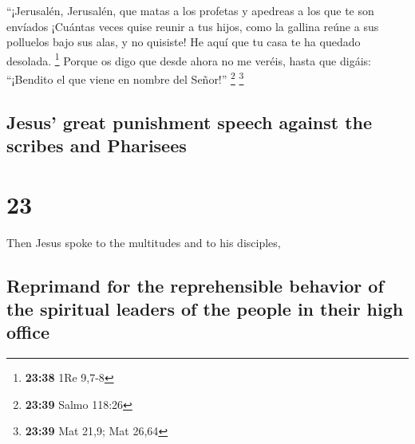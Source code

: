 \begin{paracol}{2}
 ``¡Jerusalén, Jerusalén, que matas a los profetas y
apedreas a los que te son envíados ¡Cuántas veces quise reunir a tus
hijos, como la gallina reúne a sus polluelos bajo sus alas, y no
quisiste!  He aquí que tu casa te ha quedado desolada.
\footnote{\textbf{23:38} 1Re 9,7-8}  Porque os digo que
desde ahora no me veréis, hasta que digáis: ``¡Bendito el que viene en
nombre del Señor!'' \footnote{\textbf{23:39} Salmo 118:26} \footnote{\textbf{23:39}
  Mat 21,9; Mat 26,64}

\switchcolumn
\begin{otherlanguage}{english}

\hypertarget{jesus-great-punishment-speech-against-the-scribes-and-pharisees}{%
\subsection{Jesus' great punishment speech against the scribes and
Pharisees}\label{jesus-great-punishment-speech-against-the-scribes-and-pharisees}}

\hypertarget{section-45}{%
\section{23}\label{section-45}}

 Then Jesus spoke to the multitudes and to his disciples,

\hypertarget{reprimand-for-the-reprehensible-behavior-of-the-spiritual-leaders-of-the-people-in-their-high-office}{%
\subsection{Reprimand for the reprehensible behavior of the spiritual
leaders of the people in their high
office}\label{reprimand-for-the-reprehensible-behavior-of-the-spiritual-leaders-of-the-people-in-their-high-office}}


\end{otherlanguage}
\end{paracol}
